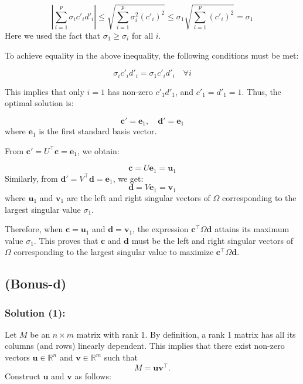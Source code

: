 \documentclass[12pt]{article}
\begin{document}
\[
\left| \sum_{i=1}^{p} \sigma_i c'_i d'_i \right| \leq \sqrt{ \sum_{i=1}^{p} \sigma_i^2 (c'_i)^2 } \leq \sigma_1 \sqrt{ \sum_{i=1}^{p} (c'_i)^2 } = \sigma_1
\]
Here we used the fact that \( \sigma_1 \geq \sigma_i \) for all \( i \).

To achieve equality in the above inequality, the following conditions must be met:

\[
\sigma_i c'_i d'_i = \sigma_1 c'_i d'_i \quad \forall i
\]

This implies that only \( i = 1 \) has non-zero \( c'_1 d'_1 \), and \( c'_1 = d'_1 = 1 \).
Thus, the optimal solution is:

\[
\mathbf{c}' = \mathbf{e}_1, \quad \mathbf{d}' = \mathbf{e}_1
\]
where \( \mathbf{e}_1 \) is the first standard basis vector.

From \( \mathbf{c}' = U^\top \mathbf{c} = \mathbf{e}_1 \), we obtain:

\[
\mathbf{c} = U \mathbf{e}_1 = \mathbf{u}_1
\]
Similarly, from \( \mathbf{d}' = V^\top \mathbf{d} = \mathbf{e}_1 \), we get:
\[
\mathbf{d} = V \mathbf{e}_1 = \mathbf{v}_1
\]
where \( \mathbf{u}_1 \) and \( \mathbf{v}_1 \) are the left and right singular vectors of \( \Omega \) corresponding to the largest singular value \( \sigma_1 \).

Therefore, when \( \mathbf{c} = \mathbf{u}_1 \) and \( \mathbf{d} = \mathbf{v}_1 \), the expression \( \mathbf{c}^\top \Omega \mathbf{d} \) attains its maximum value \( \sigma_1 \). This proves that \( \mathbf{c} \) and \( \mathbf{d} \) must be the left and right singular vectors of \( \Omega \) corresponding to the largest singular value to maximize \( \mathbf{c}^\top \Omega \mathbf{d} \).

\subsection*{(Bonus-d)}

\subsubsection*{Solution (1):}

Let \( M \) be an \( n \times m \) matrix with rank 1. By definition, a rank 1 matrix has all its columns (and rows) linearly dependent. This implies that there exist non-zero vectors \( \mathbf{u} \in \mathbb{R}^n \) and \( \mathbf{v} \in \mathbb{R}^m \) such that
\[
M = \mathbf{u} \mathbf{v}^\top.
\]
Construct \( \mathbf{u} \) and \( \mathbf{v} \) as follows:
\end{document}
